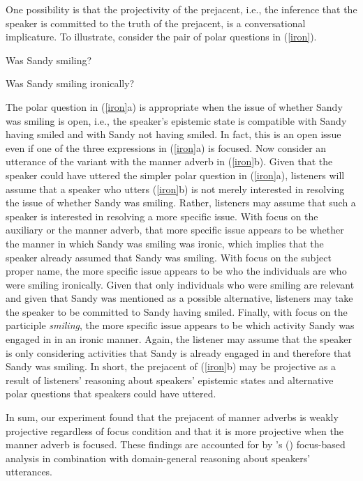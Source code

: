 \documentclass[a4paper,12pt]{article}
\newcommand{\6}{\mbox{$[\hspace*{-.6mm}[$}}
\newcommand{\9}{\mbox{$]\hspace*{-.6mm}]$}}
\newcommand{\citetpos}[1]{\citeauthor{#1}'s (\citeyear{#1})}
\begin{document}
One possibility is that the projectivity of the prejacent, i.e., the inference that the speaker is committed to the truth of the prejacent, is a conversational implicature. To illustrate, consider the pair of polar questions in (\ref{iron}). 

\begin{exe}
\ex\label{iron} 
\begin{xlist}
\ex Was Sandy smiling?

\ex Was Sandy smiling ironically?
\end{xlist}
\end{exe}
The polar question in (\ref{iron}a) is appropriate when the issue of whether Sandy was smiling is open, i.e., the speaker's epistemic state is compatible with Sandy having smiled and with Sandy not having smiled. In fact, this is an open issue even if one of the three expressions in (\ref{iron}a) is focused. Now consider an utterance of the variant with the manner adverb in (\ref{iron}b). Given that the speaker could have uttered the simpler polar question in (\ref{iron}a), listeners will assume that a speaker who utters (\ref{iron}b) is not merely interested in resolving the issue of whether Sandy was smiling. Rather, listeners may assume that such a speaker is interested in resolving a more specific issue. With focus on the auxiliary or the manner adverb, that more specific issue appears to be whether the manner in which Sandy was smiling was ironic, which implies that the speaker already assumed that Sandy was smiling. With focus on the subject proper name, the more specific issue appears to be who the individuals are who were smiling ironically. Given that only individuals who were smiling are relevant and given that Sandy was mentioned as a possible alternative, listeners may take the speaker to be committed to Sandy having smiled. Finally, with focus on the participle {\em smiling}, the more specific issue appears to be which activity Sandy was engaged in in an ironic manner. Again, the listener may assume that the speaker is only considering activities  that Sandy is already engaged in and therefore that Sandy was smiling. In short, the prejacent of (\ref{iron}b) may be projective as a result of listeners' reasoning about speakers' epistemic states and alternative polar questions that speakers could have uttered.

In sum, our experiment found that the prejacent of manner adverbs is weakly projective regardless of focus condition and that it is more projective when the manner adverb is focused. These findings are accounted for by \citetpos{stevens-etal2017} focus-based analysis in combination with domain-general reasoning about speakers' utterances. 
\end{document}
